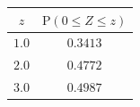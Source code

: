 {\setlength{\tabcolsep}{5pt}\renewcommand{\arraystretch}{1.25}%
\begin{tabular}{|c|c|}
\hline
$z$ & $\mathrm{P}(0\le Z\le z)$ \\
\hline
$1.0$ & $0.3413$ \\
\hline
$2.0$ & $0.4772$ \\
\hline
$3.0$ & $0.4987$ \\
\hline
\end{tabular}}
